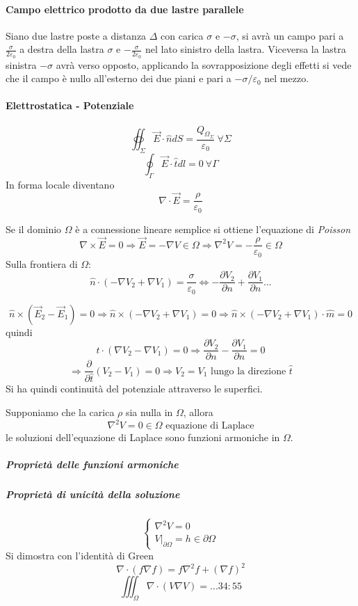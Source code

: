 
\paragraph{Campo elettrico prodotto da due lastre parallele}
Siano due lastre poste a distanza $\Delta$ con carica $\sigma$ e $-\sigma$,
si avrà un campo pari a $\frac{\sigma}{2\varepsilon_0}$ a destra della
lastra $\sigma$ e $-\frac{\sigma}{2\varepsilon_0}$ nel lato sinistro della lastra.
Viceversa la lastra sinistra $-\sigma$ avrà verso opposto, applicando la sovrapposizione degli 
effetti si vede che il campo è nullo all'esterno dei due piani e pari a $-\sigma/\varepsilon_0$ 
nel mezzo.

\paragraph{Elettrostatica - Potenziale}
$$
\oiint_\Sigma \vec{E}\cdot\hat{n} dS = \frac{Q_{\Omega_\Sigma}}{\varepsilon_0}\ \forall\Sigma
$$
$$
\oint_\Gamma \vec{E}\cdot\hat{t} dl =0\ \forall \Gamma
$$
In forma locale diventano
$$
\nabla\cdot\vec{E} = \frac{\rho}{\varepsilon_0}
$$

Se il dominio $\Omega$ è a connessione lineare semplice si ottiene l'equazione di \textit{Poisson}
$$
\nabla\times\vec{E} = 0 \Rightarrow \vec{E} = - \nabla V \in \Omega \Rightarrow \nabla^2V = -\frac{\rho}{\varepsilon_0} \in \Omega
$$
Sulla frontiera di $\Omega$:
$$
\hat{n}\cdot\left(-\nabla V_2 + \nabla V_1\right) = \frac{\sigma}{\varepsilon_0} \Leftrightarrow
-\frac{\partial V_2}{\partial n} + \frac{\partial V_1}{\partial n}...
$$


$$
\hat{n}\times\left(\vec{E}_2-\vec{E}_1\right) = 0 \Rightarrow \hat{n}\times\left(-\nabla V_2 + \nabla V_1\right) = 0 \Rightarrow \hat{n}\times\left(-\nabla V_2 + \nabla V_1\right)\cdot\hat{m} = 0
$$
quindi
$$
\hat{t}\cdot\left(\nabla V_2 - \nabla V_1\right) = 0 \Rightarrow \frac{\partial V_2}{\partial n} - \frac{\partial V_1}{\partial n} = 0
$$
$$
\Rightarrow \frac{\partial}{\partial \hat{t}}(V_2-V_1) = 0 \Rightarrow V_2 = V_1
\text{ lungo la direzione }\hat{t}
$$
Si ha quindi continuità del potenziale attraverso le superfici.

Supponiamo che la carica $\rho$ sia nulla in $\Omega$, allora
$$
\nabla^2 V = 0 \in \Omega \text{ equazione di Laplace}
$$
le soluzioni dell'equazione di Laplace sono funzioni armoniche in $\Omega$.

\subparagraph{Proprietà delle funzioni armoniche}

\subparagraph{Proprietà di unicità della soluzione}
$$
\begin{cases}
\nabla^2 V = 0\\
\left.V\right|_{\partial\Omega} = h \in \partial\Omega
\end{cases}
$$
Si dimostra con l'identità di Green
$$
\nabla\cdot(f\nabla f) = f\nabla^2f + (\nabla f)^2
$$
$$
\iiint_\Omega \nabla\cdot(V\nabla V) = ... 34:55
$$

